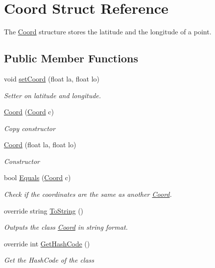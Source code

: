\hypertarget{structCoord}{}\section{Coord Struct Reference}
\label{structCoord}


The \hyperlink{structCoord}{Coord} structure stores the latitude and the longitude of a point.  


\subsection*{Public Member Functions}
\begin{DoxyCompactItemize}
\item 
void \hyperlink{structCoord_ab79364bcc0a8163ef89f35da474ab296}{set\+Coord} (float la, float lo)
\begin{DoxyCompactList}\small\item\em Setter on latitude and longitude. \end{DoxyCompactList}\item 
\hyperlink{structCoord_ac64010b7110b871868064d853b09435a}{Coord} (\hyperlink{structCoord}{Coord} c)
\begin{DoxyCompactList}\small\item\em Copy constructor \end{DoxyCompactList}\item 
\hyperlink{structCoord_a810b3b1d700e2066973eb243b4ec474b}{Coord} (float la, float lo)
\begin{DoxyCompactList}\small\item\em Constructor \end{DoxyCompactList}\item 
bool \hyperlink{structCoord_ab1c8eb195f1274c1869a13a835b927e2}{Equals} (\hyperlink{structCoord}{Coord} c)
\begin{DoxyCompactList}\small\item\em Check if the coordinates are the same as another \hyperlink{structCoord}{Coord}. \end{DoxyCompactList}\item 
override string \hyperlink{structCoord_a051a016fb4dcf8df16320d9d323f842e}{To\+String} ()
\begin{DoxyCompactList}\small\item\em Outputs the class \hyperlink{structCoord}{Coord} in string format. \end{DoxyCompactList}\item 
override int \hyperlink{structCoord_ac51299e2985ea7e24e73b40667e572f5}{Get\+Hash\+Code} ()
\begin{DoxyCompactList}\small\item\em Get the Hash\+Code of the class \end{DoxyCompactList}\end{DoxyCompactItemize}
